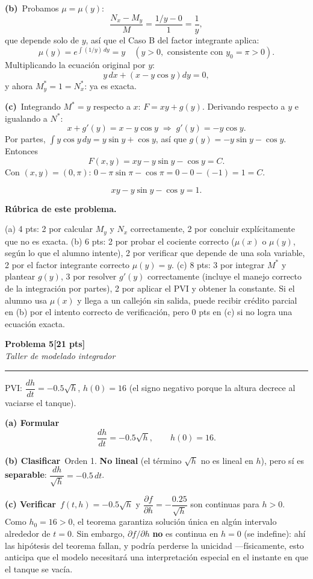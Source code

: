 \documentclass[11pt,letterpaper]{article}
\newcommand{\problema}[3]{%
  \bigskip\bigskip\noindent
  {\Large\textbf{Problema #1}}\hfill\textbf{[#2 pts]}\\[3pt]
  {\small\itshape #3}\par
  \vspace{2pt}\hrule\vspace{8pt}
}
\newcommand{\subparte}[2]{%
  \medskip\noindent\textbf{(#1}\ #2\par\smallskip
}
\newenvironment{resultado}
  {\begin{mdframed}[linecolor=black,linewidth=0.6pt,
    innerleftmargin=6pt,innerrightmargin=6pt,innertopmargin=4pt,innerbottommargin=4pt]
   \bfseries}
  {\end{mdframed}}
\newenvironment{rubrica}{%
  \begin{mdframed}[linecolor=black,linewidth=0.6pt,
    innerleftmargin=8pt,innerrightmargin=8pt,innertopmargin=5pt,innerbottommargin=5pt]
  \small\textbf{Rúbrica de este problema.}\par\smallskip
}{\end{mdframed}}
\begin{document}
\subparte{b)}{Probamos $\mu=\mu(y)$:
\[
\frac{N_x-M_y}{M} = \frac{1/y - 0}{1} = \frac{1}{y},
\]
que depende solo de $y$, así que el Caso B del factor integrante aplica:
\[
\mu(y) = e^{\int (1/y)\,dy} = y \quad (y>0, \text{ consistente con } y_0=\pi>0).
\]
Multiplicando la ecuación original por $y$:
\[
y\,dx + \left(x - y\cos y\right) dy = 0,
\]
y ahora $M^*_y = 1 = N^*_x$: \checkmark ya es exacta.}

\subparte{c)}{Integrando $M^*=y$ respecto a $x$: $F = xy + g(y)$. Derivando respecto a $y$ e igualando a $N^*$:
\[
x + g'(y) = x - y\cos y \;\Longrightarrow\; g'(y) = -y\cos y.
\]
Por partes, $\int y\cos y\,dy = y\sin y + \cos y$, así que $g(y) = -y\sin y - \cos y$. Entonces
\[
F(x,y) = xy - y\sin y - \cos y = C.
\]
Con $(x,y)=(0,\pi)$: $0 - \pi\sin\pi - \cos\pi = 0-0-(-1) = 1 = C$.
\begin{resultado}
\[
xy - y\sin y - \cos y = 1.
\]
\end{resultado}}

\begin{rubrica}
(a) 4 pts: 2 por calcular $M_y$ y $N_x$ correctamente, 2 por concluir explícitamente que no es exacta. (b) 6 pts: 2 por probar el cociente correcto ($\mu(x)$ o $\mu(y)$, según lo que el alumno intente), 2 por verificar que depende de una sola variable, 2 por el factor integrante correcto $\mu(y)=y$. (c) 8 pts: 3 por integrar $M^*$ y plantear $g(y)$, 3 por resolver $g'(y)$ correctamente (incluye el manejo correcto de la integración por partes), 2 por aplicar el PVI y obtener la constante. Si el alumno usa $\mu(x)$ y llega a un callejón sin salida, puede recibir crédito parcial en (b) por el intento correcto de verificación, pero 0 pts en (c) si no logra una ecuación exacta.
\end{rubrica}

\problema{5}{21}{Taller de modelado integrador}

PVI: $\dfrac{dh}{dt} = -0.5\sqrt{h}$, $h(0)=16$ (el signo negativo porque la altura decrece al vaciarse el tanque).

\subparte{a) Formular}{
\[
\frac{dh}{dt} = -0.5\sqrt{h}, \qquad h(0)=16.
\]
}

\subparte{b) Clasificar}{Orden 1. \textbf{No lineal} (el término $\sqrt{h}$ no es lineal en $h$), pero sí es \textbf{separable}: $\dfrac{dh}{\sqrt{h}} = -0.5\,dt$.}

\subparte{c) Verificar}{$f(t,h)=-0.5\sqrt{h}$ y $\dfrac{\partial f}{\partial h} = -\dfrac{0.25}{\sqrt{h}}$ son continuas para $h>0$. Como $h_0=16>0$, el teorema garantiza solución única en algún intervalo alrededor de $t=0$. Sin embargo, $\partial f/\partial h$ \textbf{no} es continua en $h=0$ (se indefine): ahí las hipótesis del teorema fallan, y podría perderse la unicidad —físicamente, esto anticipa que el modelo necesitará una interpretación especial en el instante en que el tanque se vacía.}
\end{document}
